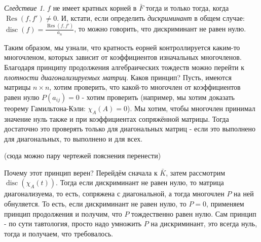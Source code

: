 \documentclass[a4paper,100pt]{article}
\theoremstyle{indented}
\theoremstyle{definition}
\theoremstyle{remark}
\newtheorem{cons}{Следствие}
\DeclareMathOperator{\Res}{Res}
\DeclareMathOperator{\disc}{disc}
\begin{document}
\begin{cons}
    $f$ не имеет кратных корней в $\bar{F}$ тогда и только тогда, когда $\Res(f, f')\neq 0$. И, кстати, если определить \textit{дискриминант} в общем случае: $\disc(f)=\frac{\Res(f, f')}{a_n}$, то можно говорить, что дискриминант не равен нулю.
\end{cons}

Таким образом, мы узнали, что кратность еорней контроллируется каким-то многочленом, которых зависит от коэффициентов изначальных многочленов. Благодаря принципу продолжения алгебраических тождеств можно перейти к \textit{плотности диагонализируемых матриц}. Каков принцип? Пусть, имеются матрицы $n\times n$, хотим проверить, что какой-то многочлен от коэффициентов равен нулю $P(a_{ij})=0$ - хотим проверить (например, мы хотим доказать теорему Гамильтона-Кэли: $\chi_A(A)=0$). Мы хотим, чтобы многочлен принимал значение нуль также и при коэффициентах сопряжённой матрицы. Тогда достаточно это проверять только для диагональных матриц - если это выполнено для диагональных, то выполнено и для всех. \ 

(сюда можно пару чертежей пояснения перенести)\ 

Почему этот принцип верен? Перейдём сначала к $\bar{K}$, затем рассмотрим $\disc(\chi_A(t))$. Тогда если дискриминант не равен нулю, то матрица диагонализуема, то есть, сопряжена с диагональной, а тогда многочлен $P$ на ней обнуляется. То есть, если дискриминант не равен нулю, то $P=0$, применяем принцип продолжения и получим, что $P$ тождественно равен нулю. Сам принцип - по сути тавтология, просто надо умножить $P$ на дискриминант, это всегда нуль, тогда и получаем, что требовалось.
\end{document}
